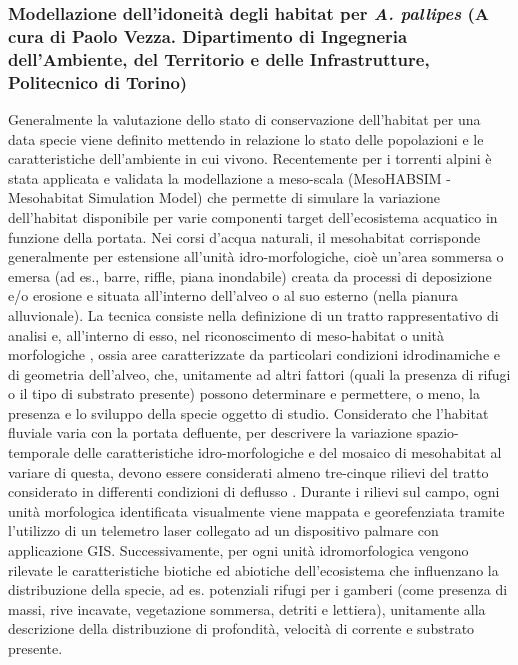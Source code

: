\documentclass[11pt,a4paper,italian,twoside,openany]{memoir}
\begin{document}
\subsubsection{Modellazione dell'idoneità degli habitat per \emph{A. pallipes} 
(A cura di Paolo Vezza. Dipartimento di Ingegneria dell'Ambiente, del Territorio e delle Infrastrutture, Politecnico di Torino)} 
\label{subsub_modellazione}
Generalmente la valutazione dello stato di conservazione dell'habitat per una data specie viene definito mettendo in relazione lo stato delle popolazioni e le caratteristiche dell'ambiente in cui vivono. Recentemente per i torrenti alpini è stata applicata e validata la modellazione a meso-scala (MesoHABSIM - Mesohabitat Simulation Model) \cite{Parasiewicz 2007} \cite{Vezza 2014} che permette di simulare la variazione dell'habitat disponibile per varie componenti target dell'ecosistema acquatico in funzione della portata. Nei corsi d'acqua naturali, il mesohabitat corrisponde generalmente per estensione all'unità idro-morfologiche, cioè un'area sommersa o emersa (ad es., barre, riffle, piana inondabile) creata da processi di deposizione e/o erosione e situata all'interno dell'alveo o al suo esterno (nella pianura alluvionale). La tecnica consiste nella definizione di un tratto rappresentativo di analisi e, all'interno di esso, nel riconoscimento di meso-habitat o unità morfologiche \cite{Rinaldi 2016}, ossia aree caratterizzate da particolari condizioni idrodinamiche e di geometria dell'alveo, che, unitamente ad altri fattori (quali la presenza di rifugi o il tipo di substrato presente) possono determinare e permettere, o meno, la presenza e lo sviluppo della specie oggetto di studio. 
Considerato che l'habitat fluviale varia con la portata defluente, per descrivere la variazione spazio-temporale delle caratteristiche idro-morfologiche e del mosaico di mesohabitat al variare di questa, devono essere considerati almeno  tre-cinque rilievi del tratto considerato in differenti condizioni di deflusso \cite{Vezza 2014}. Durante i rilievi sul campo, ogni unità morfologica identificata visualmente viene mappata e georefenziata tramite l'utilizzo di un telemetro laser collegato ad un dispositivo palmare con applicazione GIS. Successivamente, per ogni unità idromorfologica vengono rilevate le caratteristiche biotiche ed abiotiche dell'ecosistema che influenzano la distribuzione della specie, ad es. potenziali rifugi per i gamberi (come presenza di massi, rive incavate, vegetazione sommersa, detriti e lettiera), unitamente alla descrizione della distribuzione di profondità, velocità di corrente e substrato presente. 
\end{document}
